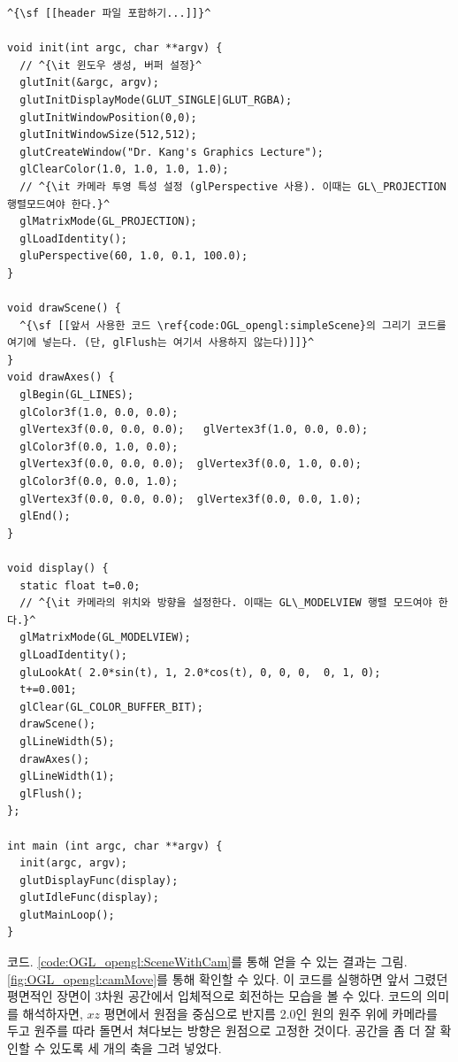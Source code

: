\begin{algorithmbis}\label{code:OGL_opengl:SceneWithCam}
\lstset{language=C++, escapechar=^} 
\begin{lstlisting}
^{\sf [[header 파일 포함하기...]]}^

void init(int argc, char **argv) {
  // ^{\it 윈도우 생성, 버퍼 설정}^
  glutInit(&argc, argv);
  glutInitDisplayMode(GLUT_SINGLE|GLUT_RGBA);
  glutInitWindowPosition(0,0);
  glutInitWindowSize(512,512);
  glutCreateWindow("Dr. Kang's Graphics Lecture");
  glClearColor(1.0, 1.0, 1.0, 1.0);
  // ^{\it 카메라 투영 특성 설정 (glPerspective 사용). 이때는 GL\_PROJECTION 행렬모드여야 한다.}^
  glMatrixMode(GL_PROJECTION);
  glLoadIdentity();
  gluPerspective(60, 1.0, 0.1, 100.0);
}

void drawScene() {
  ^{\sf [[앞서 사용한 코드 \ref{code:OGL_opengl:simpleScene}의 그리기 코드를 여기에 넣는다. (단, glFlush는 여기서 사용하지 않는다)]]}^
}
void drawAxes() {
  glBegin(GL_LINES);
  glColor3f(1.0, 0.0, 0.0);
  glVertex3f(0.0, 0.0, 0.0);   glVertex3f(1.0, 0.0, 0.0);
  glColor3f(0.0, 1.0, 0.0);
  glVertex3f(0.0, 0.0, 0.0);  glVertex3f(0.0, 1.0, 0.0);
  glColor3f(0.0, 0.0, 1.0);
  glVertex3f(0.0, 0.0, 0.0);  glVertex3f(0.0, 0.0, 1.0);
  glEnd();
}

void display() {
  static float t=0.0;
  // ^{\it 카메라의 위치와 방향을 설정한다. 이때는 GL\_MODELVIEW 행렬 모드여야 한다.}^
  glMatrixMode(GL_MODELVIEW);
  glLoadIdentity();
  gluLookAt( 2.0*sin(t), 1, 2.0*cos(t), 0, 0, 0,  0, 1, 0);
  t+=0.001;
  glClear(GL_COLOR_BUFFER_BIT);
  drawScene();		
  glLineWidth(5);
  drawAxes();		
  glLineWidth(1);
  glFlush();
};

int main (int argc, char **argv) {
  init(argc, argv);
  glutDisplayFunc(display);
  glutIdleFunc(display);
  glutMainLoop();
}
\end{lstlisting}
\end{algorithmbis}

코드. \ref{code:OGL_opengl:SceneWithCam}를 통해 얻을 수 있는 결과는 그림. \ref{fig:OGL_opengl:camMove}를 통해 확인할 수 있다.
이 코드를 실행하면 앞서 그렸던 평면적인 장면이 3차원 공간에서 입체적으로 회전하는 모습을 볼 수 있다.
코드의 의미를 해석하자면, $xz$ 평면에서 원점을 중심으로 반지름 2.0인 원의 원주 위에 카메라를 두고 원주를 따라 돌면서
쳐다보는 방향은 원점으로 고정한 것이다. 공간을 좀 더 잘 확인할 수 있도록 세 개의 축을 그려 넣었다.

